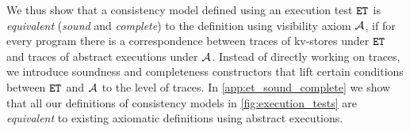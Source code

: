 We thus show that a consistency model defined using an execution test \( \et \) is \emph{equivalent}
(\ie \emph{sound} and \emph{complete})
to the definition using visibility axiom \( \visaxioms \),
if for every program there is a correspondence
between traces of kv-stores under \( \et \) and 
traces of abstract executions under \( \visaxioms \).
Instead of directly working on traces,
we introduce soundness and completeness constructors
that lift certain conditions between \( \et \) and \( \visaxioms \) to the level of traces. 
In \cref{app:et_sound_complete} we show that 
all our definitions of consistency models in \cref{fig:execution_tests} 
are \emph{equivalent} to existing axiomatic definitions using abstract executions.

